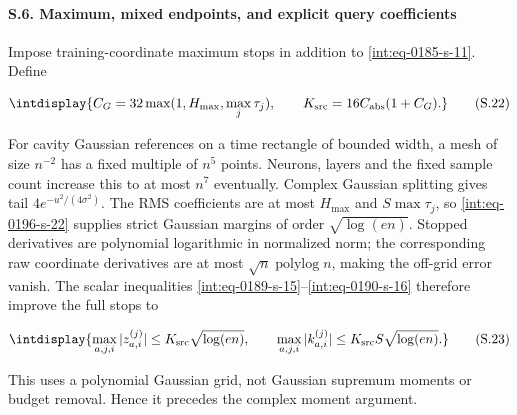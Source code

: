 \paragraph{S.6. Maximum, mixed endpoints, and explicit query coefficients}

\mbox{}\par\smallskip


Impose training-coordinate maximum stops in addition to \eqref{int:eq-0185-s-11}. Define


\begingroup\renewcommand{\theHequation}{intdisplay.397}
\begin{equation}
\intdisplay{
C_G=32\max(1,H_{\max},\max_j\tau_j),\qquad
K_{\rm src}=16C_{\rm abs}(1+C_G).
}
\tag{S.22}
\label{int:eq-0196-s-22}
\end{equation}
\endgroup


For cavity Gaussian references on a time rectangle of bounded width, a mesh of size \(n^{-2}\) has a fixed multiple of \(n^5\) points. Neurons, layers and the fixed sample count increase this to at most \(n^7\) eventually. Complex Gaussian splitting gives tail \(4e^{-u^2/(4\sigma^2)}\). The RMS coefficients are at most \(H_{\max}\) and \(S\max\tau_j\), so \eqref{int:eq-0196-s-22} supplies strict Gaussian margins of order \(\sqrt{\log(en)}\). Stopped derivatives are polynomial logarithmic in normalized norm; the corresponding raw coordinate derivatives are at most \(\sqrt n\operatorname{polylog}n\), making the off-grid error vanish. The scalar inequalities \eqref{int:eq-0189-s-15}--\allowbreak \eqref{int:eq-0190-s-16} therefore improve the full stops to


\begingroup\renewcommand{\theHequation}{intdisplay.398}
\begin{equation}
\intdisplay{
\max_{a,j,i}|z_{a,i}^{(j)}|\le K_{\rm src}\sqrt{\log(en)},\qquad
\max_{a,j,i}|k_{a,i}^{(j)}|\le K_{\rm src}S\sqrt{\log(en)}.
}
\tag{S.23}
\label{int:eq-0197-s-23}
\end{equation}
\endgroup


This uses a polynomial Gaussian grid, not Gaussian supremum moments or budget removal. Hence it precedes the complex moment argument.



